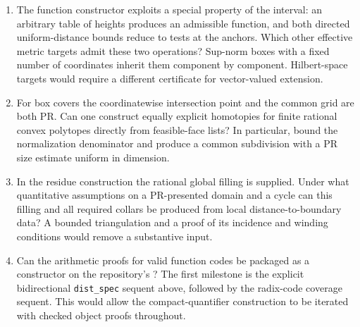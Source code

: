 \begin{enumerate}
\item The function constructor exploits a special property of the interval: an arbitrary table of heights produces an admissible function, and both directed uniform-distance bounds reduce to tests at the anchors. Which other effective metric targets admit these two operations? Sup-norm boxes with a fixed number of coordinates inherit them component by component. Hilbert-space targets would require a different certificate for vector-valued extension.
\item For box covers the coordinatewise intersection point and the common grid are both PR. Can one construct equally explicit homotopies for finite rational convex polytopes directly from feasible-face lists? In particular, bound the normalization denominator and produce a common subdivision with a PR size estimate uniform in dimension.
\item In the residue construction the rational global filling is supplied. Under what quantitative assumptions on a PR-presented domain and a cycle can this filling and all required collars be produced from local distance-to-boundary data? A bounded triangulation and a proof of its incidence and winding conditions would remove a substantive input.
\item Can the arithmetic proofs for valid function codes be packaged as a constructor on the repository's ? The first milestone is the explicit bidirectional \texttt{dist\_spec} sequent above, followed by the radix-code coverage sequent. This would allow the compact-quantifier construction to be iterated with checked object proofs throughout.
\end{enumerate}
